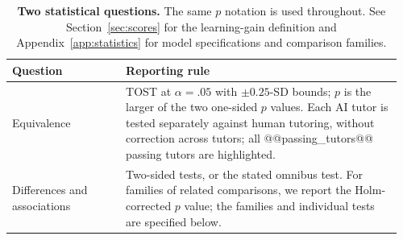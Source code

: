 \begin{table}[!htbp]
\centering
\caption{\textbf{Two statistical questions.} The same $p$ notation is used throughout. See Section~\ref{sec:scores} for the learning-gain definition and Appendix~\ref{app:statistics} for model specifications and comparison families.}
\label{tab:pvalue_conventions}
\begin{tabular}{@{}p{0.28\linewidth}p{0.68\linewidth}@{}}
\toprule
Question & Reporting rule \\
\midrule
Equivalence & TOST at $\alpha{=}.05$ with $\pm0.25$-SD bounds; $p$ is the larger of the two one-sided $p$ values. Each AI tutor is tested separately against human tutoring, without correction across tutors; all @@passing_tutors@@ passing tutors are highlighted. \\
Differences and associations & Two-sided tests, or the stated omnibus test. For families of related comparisons, we report the Holm-corrected $p$ value; the families and individual tests are specified below. \\
\bottomrule
\end{tabular}
\end{table}